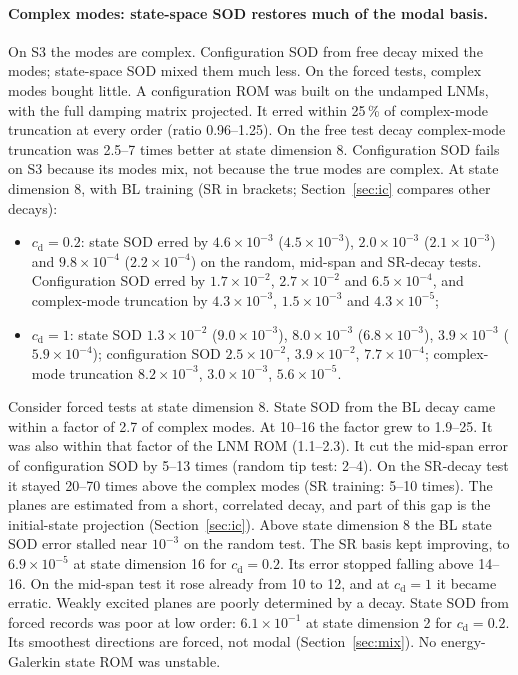 \documentclass[preprint,12pt]{elsarticle}
\begin{document}
\paragraph{Complex modes: state-space SOD restores much of the modal basis.} On S3 the modes are complex. Configuration SOD from free decay mixed the modes; state-space SOD mixed them much less.
On the forced tests, complex modes bought little. A configuration ROM was built on the undamped LNMs, with the full damping matrix projected. It erred within 25\,\% of complex-mode truncation at every order (ratio 0.96--1.25). On the free test decay complex-mode truncation was 2.5--7 times better at state dimension 8. Configuration SOD fails on S3 because its modes mix, not because the true modes are complex.
At state dimension 8, with BL training (SR in brackets; Section~\ref{sec:ic} compares other decays):
\begin{itemize}
\item $c_{\mathrm d}=0.2$: state SOD erred by $4.6\times10^{-3}$ ($4.5\times10^{-3}$), $2.0\times10^{-3}$ ($2.1\times10^{-3}$) and $9.8\times10^{-4}$ ($2.2\times10^{-4}$) on the random, mid-span and SR-decay tests. Configuration SOD erred by $1.7\times10^{-2}$, $2.7\times10^{-2}$ and $6.5\times10^{-4}$, and complex-mode truncation by $4.3\times10^{-3}$, $1.5\times10^{-3}$ and $4.3\times10^{-5}$;
\item $c_{\mathrm d}=1$: state SOD $1.3\times10^{-2}$ ($9.0\times10^{-3}$), $8.0\times10^{-3}$ ($6.8\times10^{-3}$), $3.9\times10^{-3}$ ($5.9\times10^{-4}$); configuration SOD $2.5\times10^{-2}$, $3.9\times10^{-2}$, $7.7\times10^{-4}$; complex-mode truncation $8.2\times10^{-3}$, $3.0\times10^{-3}$, $5.6\times10^{-5}$.
\end{itemize}
Consider forced tests at state dimension 8. State SOD from the BL decay came within a factor of 2.7 of complex modes. At 10--16 the factor grew to 1.9--25. It was also within that factor of the LNM ROM (1.1--2.3). It cut the mid-span error of configuration SOD by 5--13 times (random tip test: 2--4). On the SR-decay test it stayed 20--70 times above the complex modes (SR training: 5--10 times). The planes are estimated from a short, correlated decay, and part of this gap is the initial-state projection (Section~\ref{sec:ic}).
Above state dimension 8 the BL state SOD error stalled near $10^{-3}$ on the random test. The SR basis kept improving, to $6.9\times10^{-5}$ at state dimension 16 for $c_{\mathrm d}=0.2$. Its error stopped falling above 14--16. On the mid-span test it rose already from 10 to 12, and at $c_{\mathrm d}=1$ it became erratic. Weakly excited planes are poorly determined by a decay.
State SOD from forced records was poor at low order: $6.1\times10^{-1}$ at state dimension 2 for $c_{\mathrm d}=0.2$. Its smoothest directions are forced, not modal (Section~\ref{sec:mix}).
No energy-Galerkin state ROM was unstable.
\end{document}
